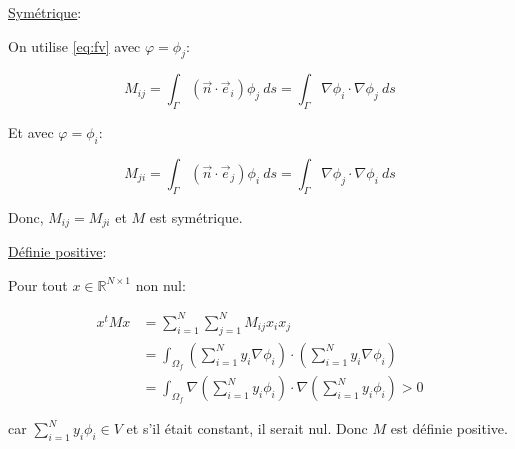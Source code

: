 \documentclass[10pt,a4paper,oneside]{article}
\begin{document}
\begin{enumerate}
\underline{Symétrique}:

On utilise \eqref{eq:fv} avec $\varphi = \phi_j$:

\[ M_{ij} = \int_{\Gamma} (\vec{n} \cdot \vec{e}_i)\phi_j\ ds = \int_{\Gamma} \nabla \phi_i \cdot \nabla \phi_j\ ds \]

Et avec $\varphi = \phi_i$:

\[ M_{ji} = \int_{\Gamma} (\vec{n} \cdot \vec{e}_j)\phi_i\ ds = \int_{\Gamma} \nabla \phi_j \cdot \nabla \phi_i\ ds \]

Donc, $M_{ij} = M_{ji}$ et $M$ est symétrique.

\underline{Définie positive}:

Pour tout $x \in \mathbb{R}^{N \times 1}$ non nul:

\begin{align*}
x^t M x &= \sum_{i = 1}^N \sum_{j = 1}^N M_{ij} x_i x_j \\
&= \int_{\Omega_f} (\sum_{i = 1}^N y_i \nabla \phi_i) \cdot (\sum_{i = 1}^N y_i \nabla \phi_i) \\
&= \int_{\Omega_f} \nabla(\sum_{i = 1}^N y_i \phi_i) \cdot \nabla(\sum_{i = 1}^N y_i \phi_i) > 0
\end{align*}

car $\sum_{i = 1}^N y_i \phi_i \in V$ et s'il était constant, il serait nul. Donc $M$ est définie positive.

\end{enumerate}
\end{document}
